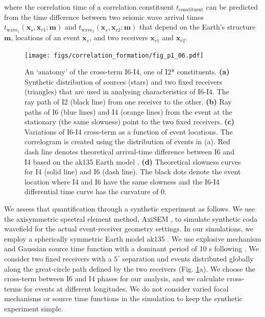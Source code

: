 where the correlation time of a correlation constituent $t_{\text{constituent}}$ can be predicted from the time difference between two seismic wave arrival times $t_{\text{wave}_1}(\boldsymbol{x}_s, \boldsymbol{x}_{r1}; \boldsymbol{m})$ and $t_{\text{wave}_2}(\boldsymbol{x}_s, \boldsymbol{x}_{r2}; \boldsymbol{m})$ that depend on the Earth's structure $\boldsymbol{m}$, locations of an event $\boldsymbol{x}_s$, and two receivers $\boldsymbol{x}_{r1}$ and $\boldsymbol{x}_{r2}$.



\begin{figure}[!hbt]
	\centering
	\texttt{[image: figs/correlation\_formation/fig\_p1\_06.pdf]}
	\caption[An `anatomy' of the cross-term I6-I4, one of the I2* constituents]
    {
		An `anatomy' of the cross-term I6-I4, one of I2* constituents. \textbf{(a)} Synthetic distribution of sources (stars) and two fixed receivers (triangles) that are used in analysing characteristics of I6-I4. The ray path of I2 (black line) from one receiver to the other. \textbf{(b)} Ray paths of I6 (blue lines) and I4 (orange lines) from the event at the stationary (the same slowness) point to the two fixed receivers. \textbf{(c)} Variations of I6-I4 cross-term as a function of event locations. The correlogram is created using the distribution of events in (a). Red dash line denotes theoretical arrival-time difference between I6 and I4 based on the ak135 Earth model \citep{kennett_constraints_1995}. \textbf{(d)} Theoretical slowness curves for I4 (solid line) and I6 (dash line). The black dots denote the event location where I4 and I6 have the same slowness and the I6-I4 differential time curve has the curvature of 0.
	}
	\label{fig:2.6}
\end{figure}


We assess that quantification through a synthetic experiment as follows. We use the axisymmetric spectral element method, AxiSEM \citep{nissen-meyer_axisem_2014}, to simulate synthetic coda wavefield for the actual event-receiver geometry settings. In our simulations, we employ a spherically symmetric Earth model ak135  \citep{kennett_constraints_1995}. We use explosive mechanism and Gaussian source time function with a dominant period of 10 s following \citet{pham_earths_2018}. We consider two fixed receivers with a $5^{\circ}$ separation and events distributed globally along the great-circle path defined by the two receivers (Fig. \ref{fig:2.6}a). We choose the cross-term between I6 and I4 phases for our analysis, and we calculate cross-terms for events at different longitudes. We do not consider varied focal mechanisms or source time functions in the simulation to keep the synthetic experiment simple.

